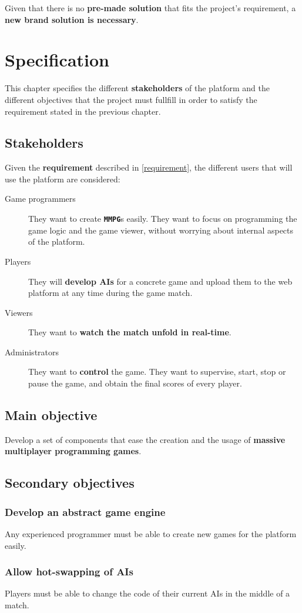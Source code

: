 \documentclass[a4paper,11pt,titlepage,abstract,numbers=noenddot,automark,mnsy,intlimits,rgb,dvipsnames]{report}
\begin{document}
Given that there is no \textbf{pre-made solution} that fits the project's requirement, a \textbf{new brand solution is necessary}.
\clearpage
\chapter{Specification}
\label{specification}
This chapter specifies the different \textbf{stakeholders} of the platform and the different objectives that the project must
fullfill in order to satisfy the requirement stated in the previous chapter.
\section{Stakeholders}
Given the \textbf{requirement} described in \autoref{requirement}, the different users that will use the platform are considered:
\begin{description}
\item[Game programmers]
They want to create \textbf{\texttt{MMPG}}s easily. They want to focus on programming the game logic and the
  game viewer, without worrying about internal aspects of the platform.
\item[Players]
They will \textbf{develop \texttt{}AI\texttt{}s} for a concrete game and upload them to the web platform at any time during
  the game match.
\item[Viewers]
They want to \textbf{watch the match unfold in real-time}.
\item[Administrators]
They want to \textbf{control} the game. They want to supervise, start, stop or pause the game, and obtain
  the final scores of every player.
\end{description}
\section{Main objective}
Develop a set of components that ease the creation and the usage of \textbf{massive multiplayer programming games}.
\section{Secondary objectives}
\label{secondary_objectives}
\subsection{Develop an abstract game engine}
\label{abstract_engine}
Any experienced programmer must be able to create new games for the platform easily.
\subsection{Allow hot-swapping of AIs}
\label{hotswap_ais}
Players must be able to change the code of their current AIs in the middle of a match.
\end{document}
